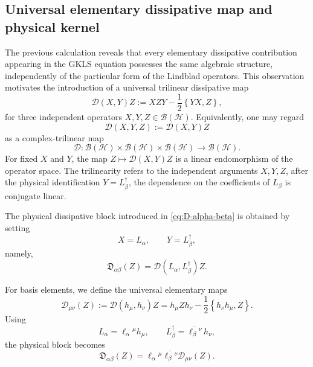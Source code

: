\documentclass[notitlepage,aip,reprint,onecolumn]{revtex4-1}
\theoremstyle{definition}
\newcommand{\acom}[2]{\left\{#1,#2\right\}}
\begin{document}
\subsection{Universal elementary dissipative map and physical kernel}

The previous calculation reveals that every elementary
dissipative contribution appearing in the GKLS equation
possesses the same algebraic structure,
independently of the particular form of the Lindblad operators.
This observation motivates the introduction of a universal
trilinear dissipative map
\begin{equation}\label{eq:universal-D-map}
    \mathcal D(X,Y)Z
    :=
    XZY
    -
    \frac12\acom{YX}{Z},
\end{equation}
for three independent operators \(X,Y,Z\in\mathcal B(\mathcal H)\).
Equivalently, one may regard
\[
    \mathcal D(X,Y,Z)
    :=
    \mathcal D(X,Y)Z
\]
as a complex-trilinear map
\[
    \mathcal D:
    \mathcal B(\mathcal H)
    \times
    \mathcal B(\mathcal H)
    \times
    \mathcal B(\mathcal H)
    \longrightarrow
    \mathcal B(\mathcal H).
\]
For fixed \(X\) and \(Y\), the map \(Z\mapsto\mathcal D(X,Y)Z\) is a linear endomorphism of the operator space. The trilinearity refers to the independent arguments \(X,Y,Z\),
after the physical identification \(Y=L_\beta^\dagger\), the dependence on the coefficients of \(L_\beta\) is conjugate linear.

The physical dissipative block introduced in \eqref{eq:D-alpha-beta} is obtained by setting
\[
    X=L_\alpha,
    \qquad
    Y=L_\beta^\dagger,
\]
namely,
\begin{equation}\label{eq:physical-D-operator}
    \mathfrak{D}_{\alpha\beta}(Z)
    =
    \mathcal D(L_\alpha,L_\beta^\dagger)Z.
\end{equation}

For basis elements, we define the universal elementary maps
\begin{equation}\label{eq:elementary-D-munu}
    \mathcal D_{\mu\nu}(Z)
    :=
    \mathcal D(h_\mu,h_\nu)Z
    =
    h_\mu Z h_\nu
    -
    \frac12\acom{h_\nu h_\mu}{Z}.
\end{equation}
Using
\[
    L_\alpha
    =
    \ell_\alpha{}^\mu h_\mu,
    \qquad
    L_\beta^\dagger
    =
    \overline{\ell_\beta{}^\nu}\,h_\nu,
\]
the physical block becomes
\begin{equation}\label{eq:physical-D-from-universal}
    \mathfrak{D}_{\alpha\beta}(Z)
    =
    \ell_\alpha{}^\mu
    \overline{\ell_\beta{}^\nu}
    \mathcal D_{\mu\nu}(Z).
\end{equation}
\end{document}
